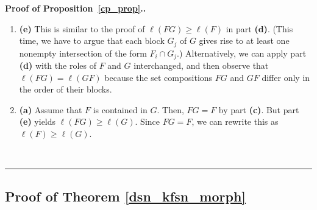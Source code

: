 \documentclass[12pt]{article}
\theoremstyle{definition}%
\theoremstyle{definition}%
\theoremstyle{remark}%
\newcommand{\tup}[1]{\left( #1 \right)}
\newenvironment{proof}[1][Proof]{\noindent\textbf{#1.} }{\ \rule{0.5em}{0.5em}}
\begin{document}
\begin{proof}[Proof of Proposition~\ref{cp_prop}.]
\begin{enumerate}[]
    It remains to show that this inequality becomes an equality if and only if
    $F$ is contained in $G$.
    
    ``If'': Assume that $F$ is contained in $G$. Then, part \textbf{(c)}
    shows that $FG = F$. Hence, $\ell\tup{FG} = \ell\tup{F}$. Thus, equality
    holds.
    
    ``Only if'': Now assume that $F$ is not contained in $G$.
    Then, there is a block of $F$ -- say, $F_{i_{0}}$ -- that is not a subset of
    any block of $G$. Hence, $F_{i_{0}}$ has nonempty intersection with more than
    one block of $G$. But the blocks of $FG$ are the nonempty intersections of the
    form $F_{i}\cap G_{j}$. Each block $F_{i}$ of $F$ gives rise to at least one
    such nonempty intersection $F_{i}\cap G_{j}$ (as we already saw above),
    but the block $F_{i_{0}}$ gives
    rise to more than one such nonempty intersection (since $F_{i_{0}}$ has
    nonempty intersection with more than
    one block of $G$). Consequently, the total
    number of nonempty intersections of the form $F_{i}\cap G_{j}$ is larger than
    the number of blocks $F_{i}$ of $F$. In other words,
    $\ell\tup{FG} > \ell\tup{F}$.
    Hence, equality does not hold in $\ell\tup{FG} \ge \ell\tup{F}$.
    The proof of part \textbf{(d)} is thus complete.
    
    \item\textbf{(e)} This is similar to the proof of
    $\ell\tup{FG} \ge \ell\tup{F}$ in part \textbf{(d)}.
    (This time, we have to argue that each block $G_j$ of $G$
    gives rise to at least one nonempty intersection of the
    form $F_i \cap G_j$.)
	Alternatively, we can apply part \textbf{(d)} with the
	roles of $F$ and $G$ interchanged, and then observe that
	$\ell\tup{FG} = \ell\tup{GF}$ because the set compositions
	$FG$ and $GF$ differ only in the order of their blocks.
    
    \item\textbf{(a)} Assume that $F$ is contained in $G$.
    Then, $FG = F$ by part \textbf{(c)}.
    But part \textbf{(e)} yields $\ell\tup{FG} \ge \ell\tup{G}$.
    Since $FG = F$, we can rewrite this as
    $\ell\tup{F} \ge \ell\tup{G}$.
    \qedhere
    \end{enumerate}
\end{proof}

\subsection{\label{subsec.omitted_proofs.rho}Proof of Theorem \ref{dsn_kfsn_morph}}
\end{document}
